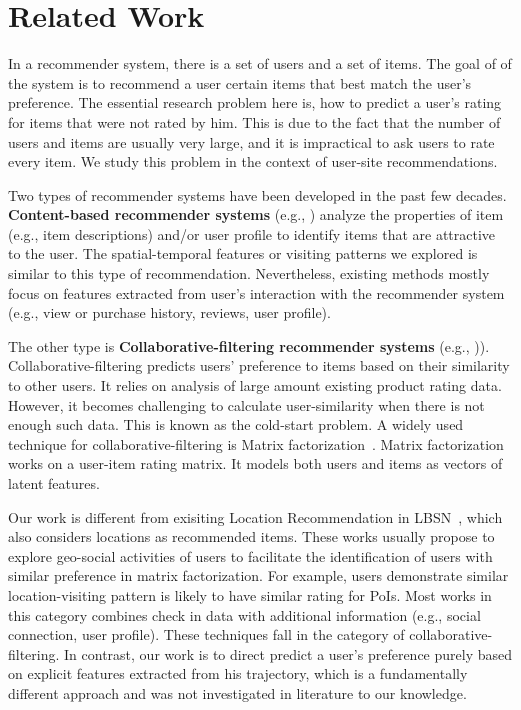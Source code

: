 
\section{Related Work}\label{sec:rw}

In a recommender system, there is a set of users and a set of items. The goal of of the system is to recommend a user certain items that best match the user's preference. The essential research problem here is, how to predict a user's rating for items that were not rated by him. This is due to the fact that the number of users and items are usually very large, and it is impractical to ask users to rate every item. We study this problem in the context of user-site recommendations.

Two types of recommender systems have been developed in the past few decades. \textbf{Content-based recommender systems} (e.g., \cite{contentbasedLang95,contentbasedPazzani97}) analyze the properties of item (e.g., item descriptions) and/or user profile to identify items that are attractive to the user. The spatial-temporal features or visiting patterns we explored is similar to this type of recommendation. Nevertheless, existing methods mostly focus on features extracted from user's interaction with the recommender system (e.g., view or purchase history, reviews, user profile).

The other type is \textbf{Collaborative-filtering recommender systems} (e.g., \cite{userUserRec94,amazonRecommendation,MFRec09})). Collaborative-filtering predicts users' preference to items based on their similarity to other users. It relies on analysis of large amount existing product rating data. However, it becomes challenging to calculate user-similarity when there is not enough such data. This is known as the cold-start problem. A widely used technique for collaborative-filtering is Matrix factorization~\cite{koren2009matrix}. Matrix factorization works on a user-item rating matrix. It models both users and items as vectors of latent features.

Our work is different from exisiting Location Recommendation in LBSN~\cite{yu2015survey, ye2010location,wang2013location, cheng2012fused}, which also considers locations as recommended items. These works usually propose to explore geo-social activities of users to facilitate the identification of users with similar preference in matrix factorization. For example, users demonstrate similar location-visiting pattern is likely to have similar rating for PoIs. Most works in this category combines check in data with additional information (e.g., social connection, user profile). These techniques fall in the category of collaborative-filtering. In contrast, our work is to direct predict a user's preference purely based on explicit features extracted from his trajectory, which is a fundamentally different approach and was not investigated in literature to our knowledge.